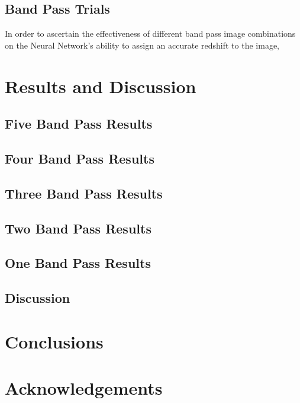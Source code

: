 \documentclass[fleqn,usenatbib]{mnras}
\begin{document}
\subsection{Band Pass Trials}
   \label{sec:bandmethod}
In order to ascertain the effectiveness of different band pass image combinations on the Neural Network's ability to assign an accurate redshift to the image, 

\section{Results and Discussion}
  \label{sec:results_and_discussion}
  
\subsection{Five Band Pass Results}
  \label{sec:five_bp_res}

\subsection{Four Band Pass Results}
  \label{sec:four_bp_res}
  
\subsection{Three Band Pass Results}
  \label{sec:three_bp_res}
  
\subsection{Two Band Pass Results}
  \label{sec:two_bp_res}

\subsection{One Band Pass Results}
  \label{sec:one_bp_res}
  
\subsection{Discussion}
  \label{sec:Discussion}
  
\section{Conclusions}
  \label{sec:conclusions}

\section*{Acknowledgements}
\end{document}
